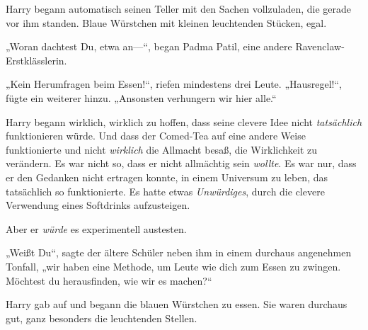 Harry begann automatisch seinen Teller mit den Sachen vollzuladen, die gerade vor ihm standen. Blaue Würstchen mit kleinen leuchtenden Stücken, egal.

„Woran dachtest Du, etwa an—“, began Padma Patil, eine andere Ravenclaw-Erstklässlerin.

„Kein Herumfragen beim Essen!“, riefen mindestens drei Leute. „Hausregel!“, fügte ein weiterer hinzu. „Ansonsten verhungern wir hier alle.“

Harry begann wirklich, wirklich zu hoffen, dass seine clevere Idee nicht \emph{tatsächlich} funktionieren würde. Und dass der Comed-Tea auf eine andere Weise funktionierte und nicht \emph{wirklich} die Allmacht besaß, die Wirklichkeit zu verändern. Es war nicht so, dass er nicht allmächtig sein \emph{wollte}. Es war nur, dass er den Gedanken nicht ertragen konnte, in einem Universum zu leben, das tatsächlich so funktionierte. Es hatte etwas \emph{Unwürdiges}, durch die clevere Verwendung eines Softdrinks aufzusteigen.

Aber er \emph{würde} es experimentell austesten.

„Weißt Du“, sagte der ältere Schüler neben ihm in einem durchaus angenehmen Tonfall, „wir haben eine Methode, um Leute wie dich zum Essen zu zwingen. Möchtest du herausfinden, wie wir es machen?“

Harry gab auf und begann die blauen Würstchen zu essen. Sie waren durchaus gut, ganz besonders die leuchtenden Stellen.

